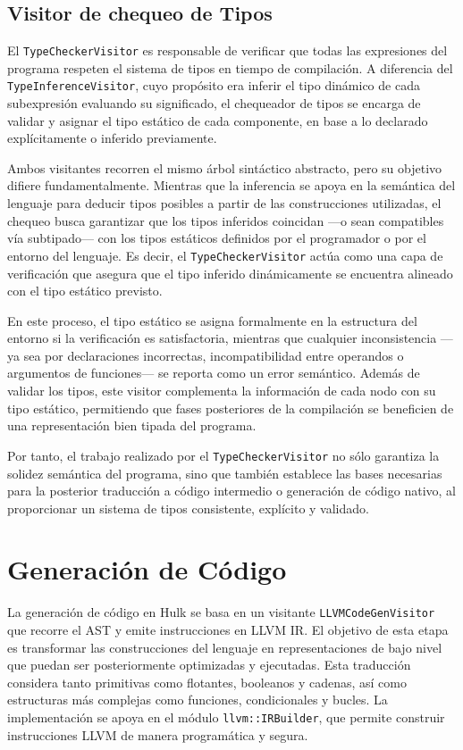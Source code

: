 \documentclass{llncs}
\begin{document}
	\subsection{Visitor de chequeo de Tipos}

	El \texttt{TypeCheckerVisitor} es responsable de verificar que todas las expresiones del programa respeten el sistema de tipos en tiempo de compilación. A diferencia del \texttt{TypeInferenceVisitor}, cuyo propósito era inferir el tipo dinámico de cada subexpresión evaluando su significado, el chequeador de tipos se encarga de validar y asignar el tipo estático de cada componente, en base a lo declarado explícitamente o inferido previamente.

	Ambos visitantes recorren el mismo árbol sintáctico abstracto, pero su objetivo difiere fundamentalmente. Mientras que la inferencia se apoya en la semántica del lenguaje para deducir tipos posibles a partir de las construcciones utilizadas, el chequeo busca garantizar que los tipos inferidos coincidan —o sean compatibles vía subtipado— con los tipos estáticos definidos por el programador o por el entorno del lenguaje. Es decir, el \texttt{TypeCheckerVisitor} actúa como una capa de verificación que asegura que el tipo inferido dinámicamente se encuentra alineado con el tipo estático previsto.

	En este proceso, el tipo estático se asigna formalmente en la estructura del entorno si la verificación es satisfactoria, mientras que cualquier inconsistencia —ya sea por declaraciones incorrectas, incompatibilidad entre operandos o argumentos de funciones— se reporta como un error semántico. Además de validar los tipos, este visitor complementa la información de cada nodo con su tipo estático, permitiendo que fases posteriores de la compilación se beneficien de una representación bien tipada del programa.

	Por tanto, el trabajo realizado por el \texttt{TypeCheckerVisitor} no sólo garantiza la solidez semántica del programa, sino que también establece las bases necesarias para la posterior traducción a código intermedio o generación de código nativo, al proporcionar un sistema de tipos consistente, explícito y validado.

	\section{Generación de Código}

	La generación de código en Hulk se basa en un visitante \texttt{LLVMCodeGenVisitor} que recorre el AST y emite instrucciones en LLVM IR. El objetivo de esta etapa es transformar las construcciones del lenguaje en representaciones de bajo nivel que puedan ser posteriormente optimizadas y ejecutadas. Esta traducción considera tanto primitivas como flotantes, booleanos y cadenas, así como estructuras más complejas como funciones, condicionales y bucles. La implementación se apoya en el módulo \texttt{llvm::IRBuilder}, que permite construir instrucciones LLVM de manera programática y segura.
\end{document}
